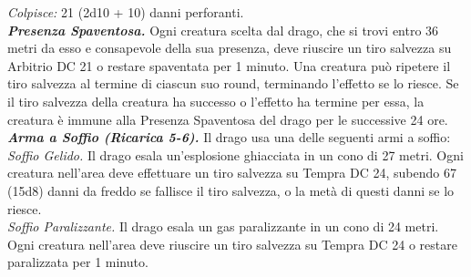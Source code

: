 \begin{multicols}{2}
\emph{Colpisce:} 21 (2d10 + 10) danni perforanti.\\
\emph{\textbf{Presenza Spaventosa.}} Ogni creatura scelta dal drago, che si trovi entro 36 metri da esso e consapevole della sua presenza, deve riuscire un tiro salvezza su Arbitrio DC 21 o restare spaventata per 1 minuto. Una creatura può ripetere il tiro salvezza al termine di ciascun suo round, terminando l'effetto se lo riesce. Se il tiro salvezza della creatura ha successo o l'effetto ha termine per essa, la creatura è immune alla Presenza Spaventosa del drago per le successive 24 ore.\\
\emph{\textbf{Arma a Soffio (Ricarica 5-6).}} Il drago usa una delle seguenti armi a soffio:\\
\emph{Soffio Gelido.} Il drago esala un'esplosione ghiacciata in un cono di 27 metri. Ogni creatura nell'area deve effettuare un tiro salvezza su Tempra DC 24, subendo 67 (15d8) danni da freddo se fallisce il tiro salvezza, o la metà di questi danni se lo riesce.\\
\emph{Soffio Paralizzante.} Il drago esala un gas paralizzante in un cono di 24 metri. Ogni creatura nell'area deve riuscire un tiro salvezza su Tempra DC 24 o restare paralizzata per 1 minuto.\\


\end{multicols}

